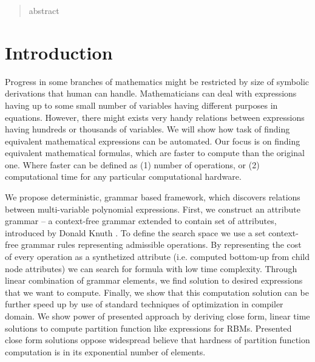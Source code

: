 \documentclass{article}
\begin{document}
 





\vskip 0.3in


\begin{abstract} 
abstract 
\end{abstract} 


\section{Introduction} \label{introduction} 
Progress in some branches of
mathematics might be restricted by size of symbolic derivations that human can
handle.  Mathematicians can deal with expressions having up to some small
number of variables having different purposes in equations. However, there
might exists very handy relations between expressions having hundreds or
thousands of variables. We will show how task of finding equivalent
mathematical expressions can be automated. Our focus is on finding equivalent
mathematical formulas, which are faster to compute than the original one. Where
faster can be defined as (1) number of operations, or (2) computational time
for any particular computational hardware.


We propose deterministic, grammar based framework, which discovers relations between
multi-variable polynomial expressions. First, we construct an attribute grammar
-- a context-free grammar extended to contain set of attributes, introduced by
Donald Knuth \cite{knuth1968semantics}. To define the search space we use a set
context-free grammar rules representing admissible operations. By representing
the cost of every operation as a synthetized attribute (i.e. computed bottom-up from child node attributes)
we can search for formula with low time complexity.
Through linear combination of grammar elements, we find solution to desired 
expressions that we want to compute. Finally, we
show that this computation solution can be further speed up by use of standard
techniques of optimization in compiler domain. We show power of presented
approach by deriving close form, linear time solutions to compute partition
function like expressions for RBMs. Presented close form solutions oppose
widespread believe that hardness of partition function computation is in its
exponential number of elements.
\end{document}
